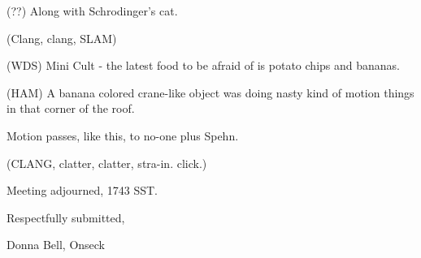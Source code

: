 \documentclass[12pt]{article}
\begin{document}
(??) Along with Schrodinger's cat.

(Clang, clang, SLAM)

(WDS) Mini Cult - the latest food to be afraid of is potato chips and bananas.

(HAM) A banana colored crane-like object was doing nasty kind of motion things in that corner of the roof.

Motion passes, like this, to no-one plus Spehn.

(CLANG, clatter, clatter, stra-in. click.)

\vspace{12pt}

\noindent
Meeting adjourned, 1743 SST.

\vspace{18pt}

\centerline{Respectfully submitted,}
\centerline{Donna Bell, Onseck}
\end{document}
